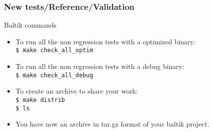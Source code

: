 \documentclass[10pt, hyperref={unicode=true,pdfusetitle, bookmarks=true,bookmarksnumbered=false,bookmarksopen=false, breaklinks=false,pdfborder={0 0 1},backref=true,colorlinks=true,linkcolor=darkblue,pageanchor, urlcolor=darkblue}]{beamer}
\begin{document}
\begin{frame}
\frametitle{New tests/Reference/Validation}
\begin{block}{Baltik commands}

\begin{itemize}
\item To run all the non regression tests with a optimized binary:\\
\texttt{\$ make check\_all\_optim}

\item To run all the non regression tests with a debug binary:\\
\texttt{\$ make check\_all\_debug}

\item To create an archive to share your work:\\
\texttt{\$ make distrib}\\
\texttt{\$ ls}

\item You have now an archive in tar.gz format of your baltik project.
\end{itemize}

\end{block}
\end{frame}



\end{document}
